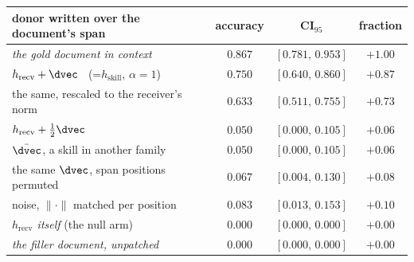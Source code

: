 \begin{tabular}{@{}lccc@{}}
\toprule
donor written over the document's span & accuracy & CI$_{95}$ & fraction \\
\midrule
\emph{the gold document in context} & $0.867$ & $[0.781,\,0.953]$ & $+1.00$ \\
$h_{\text{recv}}+\dvec$ \ (=$h_{\text{skill}}$, $\alpha=1$) & $0.750$ & $[0.640,\,0.860]$ & $+0.87$ \\
the same, rescaled to the receiver's norm & $0.633$ & $[0.511,\,0.755]$ & $+0.73$ \\
$h_{\text{recv}}+\tfrac12\dvec$ & $0.050$ & $[0.000,\,0.105]$ & $+0.06$ \\
$\bar{\dvec}$, a skill in another family & $0.050$ & $[0.000,\,0.105]$ & $+0.06$ \\
the same $\dvec$, span positions permuted & $0.067$ & $[0.004,\,0.130]$ & $+0.08$ \\
noise, $\|\cdot\|$ matched per position & $0.083$ & $[0.013,\,0.153]$ & $+0.10$ \\
\emph{$h_{\text{recv}}$ itself} (the null arm) & $0.000$ & $[0.000,\,0.000]$ & $+0.00$ \\
\emph{the filler document, unpatched} & $0.000$ & $[0.000,\,0.000]$ & $+0.00$ \\
\bottomrule
\end{tabular}
